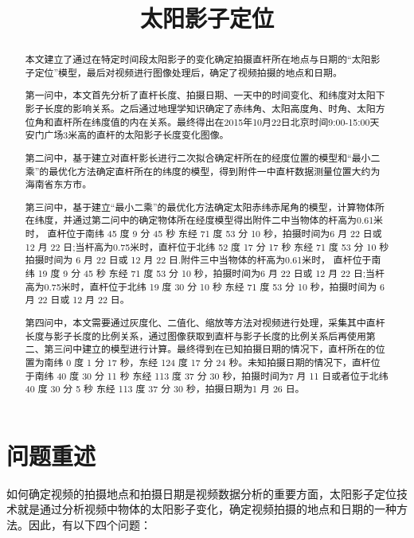 \documentclass[withoutpreface,bwprint]{cumcmthesis} %
\title{太阳影子定位}
\begin{document}
 \maketitle
\begin{abstract}
\par 本文建立了通过在特定时间段太阳影子的变化确定拍摄直杆所在地点与日期的“太阳影子定位”模型，最后对视频进行图像处理后，确定了视频拍摄的地点和日期。
\par 第一问中，本文首先分析了直杆长度、拍摄日期、一天中的时间变化、和纬度对太阳下影子长度的影响关系。之后通过地理学知识确定了赤纬角、太阳高度角、时角、太阳方位角和直杆所在纬度值的内在关系。最终得出在2015年10月22日北京时间9:00-15:00天安门广场3米高的直杆的太阳影子长度变化图像。
\par 第二问中，基于建立对直杆影长进行二次拟合确定杆所在的经度位置的模型和“最小二乘”的最优化方法确定直杆所在的纬度的模型，得到附件一中直杆数据测量位置大约为海南省东方市。
\par 第三问中，基于建立“最小二乘”的最优化方法确定太阳赤纬赤尾角的模型，计算物体所在纬度，并通过第二问中的确定物体所在经度模型得出附件二中当物体的杆高为0.61米时， 直杆位于南纬 45 度 9 分 45 秒 东经 71 度 53 分 10 秒，拍摄时间为6 ⽉ 22 ⽇或 12 ⽉ 22 ⽇;当杆高为0.75米时，直杆位于北纬 52 度 17 分 17 秒 东经 71 度 53 分 10 秒拍摄时间为 6 ⽉ 22 ⽇或 12 ⽉ 22 ⽇.附件三中当物体的杆高为0.61米时， 直杆位于南纬 19 度 9 分 45 秒 东经 71 度 53 分 10 秒，拍摄时间为6 ⽉ 22 ⽇或 12 ⽉ 22 ⽇;当杆高为0.75米时，直杆位于北纬 19 度 30 分 10 秒 东经 71 度 53 分 10 秒，拍摄时间为 6 ⽉ 22 ⽇或 12 ⽉ 22 ⽇。
\par 第四问中，本文需要通过灰度化、⼆值化、缩放等⽅法对视频进⾏处理，采集其中直杆长度与影⼦长度的⽐例关系，通过图像获取到直杆与影⼦长度的⽐例关系后再使⽤第⼆、第三问中建⽴的模型进⾏计算。最终得到在已知拍摄日期的情况下，直杆所在的位置为南纬 0 度 1 分 17 秒，东经 124 度 17 分 24 秒。未知拍摄日期的情况下，直杆位于南纬 40 度 30 分 11 秒 东经 113 度 37 分 30 秒，拍摄时间为7 ⽉ 11 ⽇或者位于北纬 40 度 30 分 5 秒 东经 113 度 37 分 30 秒，拍摄日期为1 ⽉ 26 ⽇。

\end{abstract}

\tableofcontents
\newpage

\section{问题重述}

\par 如何确定视频的拍摄地点和拍摄日期是视频数据分析的重要方面，太阳影子定位技术就是通过分析视频中物体的太阳影子变化，确定视频拍摄的地点和日期的一种方法。因此，有以下四个问题：
\end{document}
